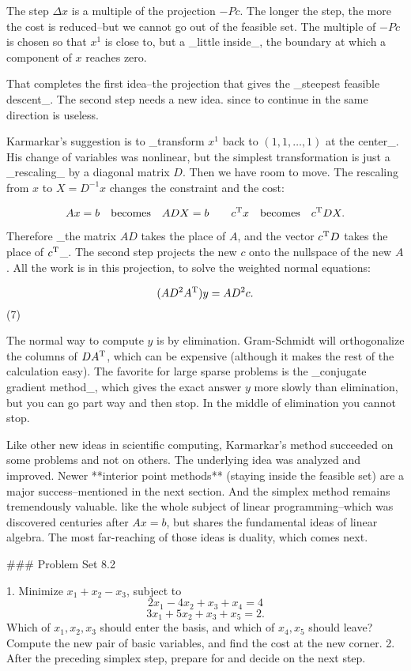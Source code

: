 The step \(\Delta x\) is a multiple of the projection \(-Pc\). The longer the step, the more the cost is reduced--but we cannot go out of the feasible set. The multiple of \(-Pc\) is chosen so that \(x^{1}\) is close to, but a _little inside_, the boundary at which a component of \(x\) reaches zero.

That completes the first idea--the projection that gives the _steepest feasible descent_. The second step needs a new idea. since to continue in the same direction is useless.

Karmarkar's suggestion is to _transform \(x^{1}\) back to \((1,1,\ldots,1)\) at the center_. His change of variables was nonlinear, but the simplest transformation is just a _rescaling_ by a diagonal matrix \(D\). Then we have room to move. The rescaling from \(x\) to \(X=D^{-1}x\) changes the constraint and the cost:

\[Ax=b\quad\mbox{becomes}\quad ADX=b\qquad c^{\rm T}x\quad\mbox{becomes}\quad c ^{\rm T}DX.\]

Therefore _the matrix \(AD\) takes the place of \(A\), and the vector \(c^{\rm T}D\) takes the place of \(c^{\rm T}\)_. The second step projects the new \(c\) onto the nullspace of the new \(A\). All the work is in this projection, to solve the weighted normal equations:

\[(AD^{2}A^{\rm T})y=AD^{2}c.\] (7)

The normal way to compute \(y\) is by elimination. Gram-Schmidt will orthogonalize the columns of \(DA^{\rm T}\), which can be expensive (although it makes the rest of the calculation easy). The favorite for large sparse problems is the _conjugate gradient method_, which gives the exact answer \(y\) more slowly than elimination, but you can go part way and then stop. In the middle of elimination you cannot stop.

Like other new ideas in scientific computing, Karmarkar's method succeeded on some problems and not on others. The underlying idea was analyzed and improved. Newer **interior point methods** (staying inside the feasible set) are a major success--mentioned in the next section. And the simplex method remains tremendously valuable. like the whole subject of linear programming--which was discovered centuries after \(Ax=b\), but shares the fundamental ideas of linear algebra. The most far-reaching of those ideas is duality, which comes next.

### Problem Set 8.2

1. Minimize \(x_{1}+x_{2}-x_{3}\), subject to \[2x_{1}-4x_{2}+x_{3}+x_{4} =4\] \[3x_{1}+5x_{2}+x_{3} +x_{5} =2.\] Which of \(x_{1},x_{2},x_{3}\) should enter the basis, and which of \(x_{4},x_{5}\) should leave? Compute the new pair of basic variables, and find the cost at the new corner.
2. After the preceding simplex step, prepare for and decide on the next step.

 